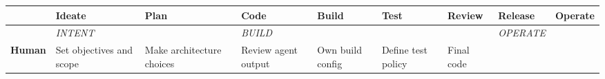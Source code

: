 \documentclass[
  a4paper,
  DIV=11,
  numbers=noendperiod]{scrreprt}
\newcounter{none} %
\begin{document}
\begin{landscape}

{\def\LTcaptype{none} %
\begin{longtable}[]{@{}
  >{\raggedright\arraybackslash}p{}
  >{\raggedright\arraybackslash}p{}
  >{\raggedright\arraybackslash}p{}
  >{\raggedright\arraybackslash}p{}
  >{\raggedright\arraybackslash}p{}
  >{\raggedright\arraybackslash}p{}
  >{\raggedright\arraybackslash}p{}
  >{\raggedright\arraybackslash}p{}
  >{\raggedright\arraybackslash}p{}@{}}
\toprule\noalign{}
\begin{minipage}[b]{\linewidth}\raggedright
\end{minipage} & \begin{minipage}[b]{\linewidth}\raggedright
Ideate
\end{minipage} & \begin{minipage}[b]{\linewidth}\raggedright
Plan
\end{minipage} & \begin{minipage}[b]{\linewidth}\raggedright
Code
\end{minipage} & \begin{minipage}[b]{\linewidth}\raggedright
Build
\end{minipage} & \begin{minipage}[b]{\linewidth}\raggedright
Test
\end{minipage} & \begin{minipage}[b]{\linewidth}\raggedright
Review
\end{minipage} & \begin{minipage}[b]{\linewidth}\raggedright
Release
\end{minipage} & \begin{minipage}[b]{\linewidth}\raggedright
Operate
\end{minipage} \\
\midrule\noalign{}
\endhead
\bottomrule\noalign{}
\endlastfoot
& \emph{INTENT} & & \emph{BUILD} & & & & \emph{OPERATE} & \\
\textbf{Human} & Set objectives and scope & Make architecture choices &
Review agent output & Own build config & Define test policy & Final code

\end{longtable}}
\end{landscape}
\end{document}
